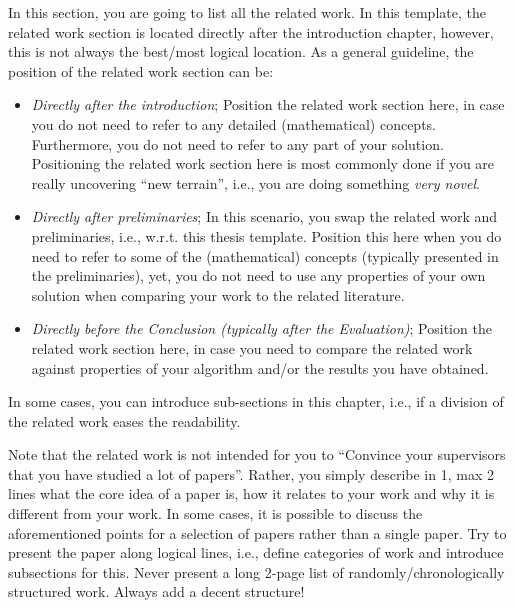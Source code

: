 In this section, you are going to list all the related work.
In this template, the related work section is located directly after the introduction chapter, however, this is not always the best/most logical location.
As a general guideline, the position of the related work section can be:
\begin{itemize}
    \item \emph{Directly after the introduction}; Position the related work section here, in case you do not need to refer to any detailed (mathematical) concepts.
    Furthermore, you do not need to refer to any part of your solution. 
    Positioning the related work section here is most commonly done if you are really uncovering ``new terrain'', i.e., you are doing something \emph{very novel}.
    \item \emph{Directly after preliminaries}; In this scenario, you swap the related work and preliminaries, i.e., w.r.t. this thesis template.
    Position this here when you do need to refer to some of the (mathematical) concepts (typically presented in the preliminaries), yet, you do not need to use any properties of your own solution when comparing your work to the related literature.
    \item \emph{Directly before the Conclusion (typically after the Evaluation)}; Position the related work section here, in case you need to compare the related work against properties of your algorithm and/or the results you have obtained.
\end{itemize}

In some cases, you can introduce sub-sections in this chapter, i.e., if a division of the related work eases the readability.

Note that the related work is not intended for you to \enquote{Convince your supervisors that you have studied a lot of papers}.
Rather, you simply describe in 1, max 2 lines what the core idea of a paper is, how it relates to your work and why it is different from your work.
In some cases, it is possible to discuss the aforementioned points for a selection of papers rather than a single paper.
Try to present the paper along logical lines, i.e., define categories of work and introduce subsections for this.
Never present a long 2-page list of randomly/chronologically structured work.
Always add a decent structure!